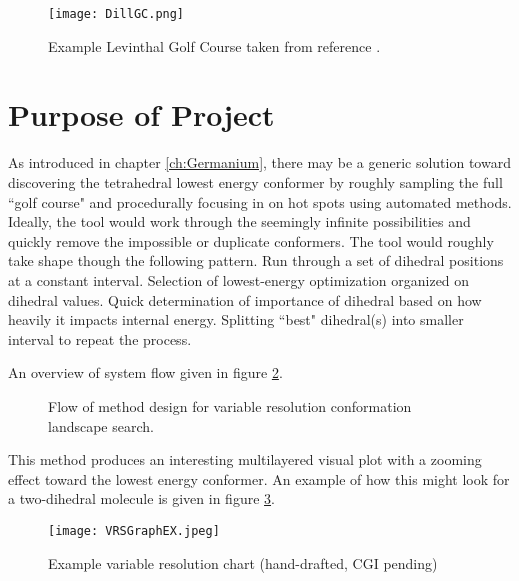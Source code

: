 \begin{figure}
	
	\centering
	
	\texttt{[image: DillGC.png]}
	
	\caption{Example Levinthal Golf Course taken from reference .}
	
	\label{fig:DillGC}
	
\end{figure}


\section{Purpose of Project}

As introduced in chapter \ref{ch:Germanium}, there may be a generic solution toward discovering the tetrahedral lowest energy conformer by roughly sampling the full ``golf course" and procedurally focusing in on hot spots using automated methods.
Ideally, the tool would work through the seemingly infinite possibilities and quickly remove the impossible or duplicate conformers.
The tool would roughly take shape though the following pattern.
Run through a set of dihedral positions at a constant interval. 
Selection of lowest-energy optimization organized on dihedral values. 
Quick determination of importance of dihedral based on how heavily it impacts internal energy. 
Splitting ``best" dihedral(s) into smaller interval to repeat the process. 

An overview of system flow given in figure \ref{fig:VRSDesign}.
\begin{figure}
	\centering 
	\caption{Flow of method design for variable resolution conformation landscape search.}
	\label{fig:VRSDesign}
	
\end{figure}
This method produces an interesting multilayered visual plot with a zooming effect toward the lowest energy conformer.
An example of how this might look for a two-dihedral molecule is given in figure \ref{fig:variableResolutionSample}.

\begin{figure}
	
	\centering
	
	\texttt{[image: VRSGraphEX.jpeg]}
	
	\caption{Example variable resolution chart (hand-drafted, CGI pending)}
	
	\label{fig:variableResolutionSample}
		
\end{figure}

